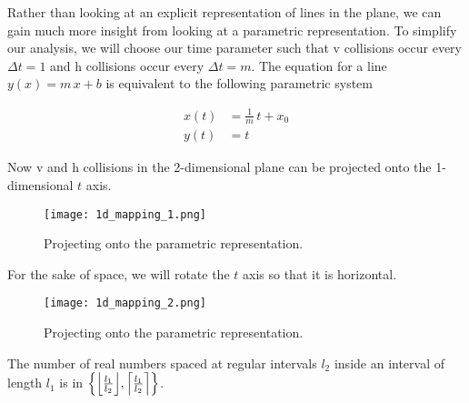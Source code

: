 
Rather than looking at an explicit representation of lines in the plane, we can gain much more insight from looking at a parametric representation. To simplify our analysis, we will choose our time parameter such that v collisions occur every $\Delta t = 1$ and h collisions occur every $\Delta t = m$. The equation for a line $y(x) = m \, x + b$ is equivalent to the following parametric system

\begin{align}\label{eq:parametric-line}
	x(t)& = \frac{1}{m} \, t + x_0\\
	y(t)& = t
\end{align}

Now v and h collisions in the 2-dimensional plane can be projected onto the 1-dimensional $t$ axis.

\begin{figure}[H]
  \begin{center}
    \texttt{[image: 1d\_mapping\_1.png]}
  \end{center}
  \vspace{-.2in} %
  \caption{\label{fig:1d-projection} Projecting onto the parametric representation.}
\end{figure}

For the sake of space, we will rotate the $t$ axis so that it is horizontal.

\begin{figure}[H]
  \begin{center}
    \texttt{[image: 1d\_mapping\_2.png]}
  \end{center}
  \vspace{-.2in} %
  \caption{\label{fig:1d-problem} Projecting onto the parametric representation.}
\end{figure}


\begin{lemma}\label{lem:interval-ticks}
	The number of real numbers spaced at regular intervals $l_2$ inside an interval of length $l_1$ is in $\cbracket{\floor{\frac{l_1}{l_2}}, \ceil{\frac{l_1}{l_2}}}$.
\end{lemma}

